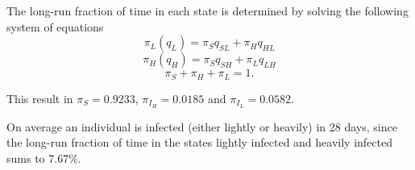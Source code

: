 The long-run fraction of time in each state is determined by solving the following system of equations
$$ \pi_L(q_L) = \pi_S q_{SL} + \pi_H q_{HL}$$
$$ \pi_H(q_H) = \pi_S q_{SH} + \pi_L q_{LH}$$
$$ \pi_S + \pi_H +\pi_L = 1 .$$

This result in $\pi_S = 0.9233$, $\pi_{I_H} = 0.0185$ and $\pi_{I_L} = 0.0582$. 

On average an individual is infected (either lightly or heavily) in 28 days, since the long-run fraction of time in the states lightly infected and heavily infected sums to $7.67\%$.

